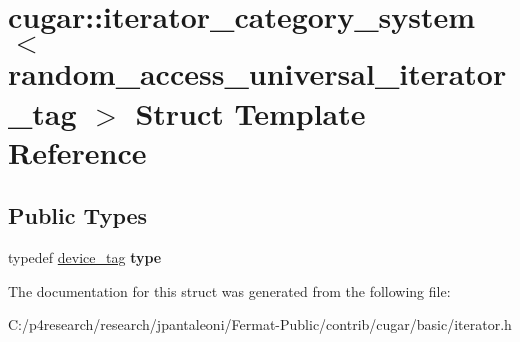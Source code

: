 \hypertarget{structcugar_1_1iterator__category__system_3_01random__access__universal__iterator__tag_01_4}{}\section{cugar\+:\+:iterator\+\_\+category\+\_\+system$<$ random\+\_\+access\+\_\+universal\+\_\+iterator\+\_\+tag $>$ Struct Template Reference}
\label{structcugar_1_1iterator__category__system_3_01random__access__universal__iterator__tag_01_4}
\subsection*{Public Types}
\begin{DoxyCompactItemize}
\item 
\mbox{\label{structcugar_1_1iterator__category__system_3_01random__access__universal__iterator__tag_01_4_a5c5b92f6de362e1218a13d44a4afe894}} 
typedef \hyperlink{structcugar_1_1device__tag}{device\+\_\+tag} {\bfseries type}
\end{DoxyCompactItemize}


The documentation for this struct was generated from the following file\+:\begin{DoxyCompactItemize}
\item 
C\+:/p4research/research/jpantaleoni/\+Fermat-\/\+Public/contrib/cugar/basic/iterator.\+h\end{DoxyCompactItemize}
